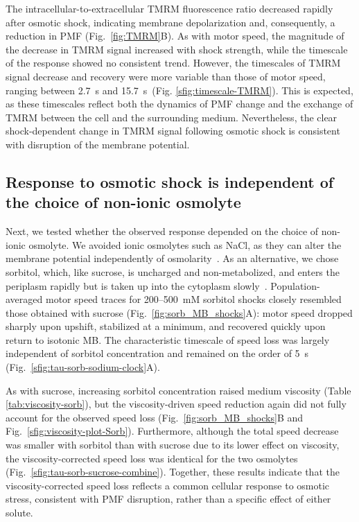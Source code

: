 \documentclass[twocolumn]{biophys-new}%
\begin{document}
The intracellular-to-extracellular TMRM fluorescence ratio decreased rapidly after osmotic shock, indicating membrane depolarization and, consequently, a reduction in PMF (Fig.~\ref{fig:TMRM}B). As with motor speed, the magnitude of the decrease in TMRM signal increased with shock strength, while the timescale of the response showed no consistent trend. However, the timescales of TMRM signal decrease and recovery were more variable than those of motor speed, ranging between 2.7~s and 15.7~s~(Fig. \ref{sfig:timescale-TMRM}). This is expected, as these timescales reflect both the dynamics of PMF change and the exchange of TMRM between the cell and the surrounding medium. Nevertheless, the clear shock-dependent change in TMRM signal following osmotic shock is consistent with disruption of the membrane potential.



\vspace{-1em} %
\noindent

\subsection*{Response to osmotic shock is independent of the choice of non-ionic osmolyte}

Next, we tested whether the observed response depended on the choice of non-ionic osmolyte. We avoided ionic osmolytes such as NaCl, as they can alter the membrane potential independently of osmolarity~\cite{berscheid2024}. As an alternative, we chose sorbitol, which, like sucrose, is uncharged and non-metabolized, and enters the periplasm rapidly but is taken up into the cytoplasm slowly~\cite{stephens2024scr,rojas2014}. Population-averaged motor speed traces for 200--500~mM sorbitol shocks closely resembled those obtained with sucrose (Fig.~\ref{fig:sorb_MB_shocks}A): motor speed dropped sharply upon upshift, stabilized at a minimum, and recovered quickly upon return to isotonic MB. The characteristic timescale of speed loss was largely independent of sorbitol concentration and remained on the order of 5~s (Fig.~\ref{sfig:tau-sorb-sodium-clock}A). 

As with sucrose, increasing sorbitol concentration raised medium viscosity (Table \ref{tab:viscosity-sorb}), but the viscosity-driven speed reduction again did not fully account for the observed speed loss (Fig.~\ref{fig:sorb_MB_shocks}B and Fig.~\ref{sfig:viscosity-plot-Sorb}). Furthermore, although the total speed decrease was smaller with sorbitol than with sucrose due to its lower effect on viscosity, the viscosity-corrected speed loss was identical for the two osmolytes (Fig.~\ref{sfig:tau-sorb-sucrose-combine}). Together, these results indicate that the viscosity-corrected speed loss reflects a common cellular response to osmotic stress, consistent with PMF disruption, rather than a specific effect of either solute.
\end{document}
